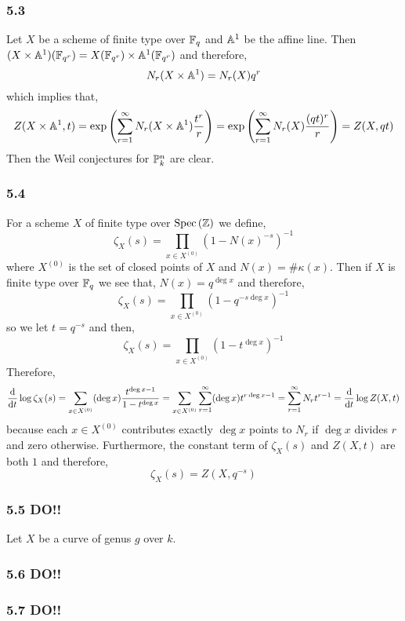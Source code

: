 \documentclass[12pt]{article}
\begin{document}
\subsubsection{5.3}

Let $X$ be a scheme of finite type over $\FF_q$ and $\A^1$ be the affine line. Then $(X \times \A^1)(\FF_{q^r}) = X(\FF_{q^r}) \times \A^1(\FF_{q^r})$ and therefore,
\[ N_r(X \times \A^1) = N_r(X) q^r \]
which implies that,
\[ Z(X \times \A^1, t) = \exp{ \left( \sum_{r = 1}^\infty N_r(X \times \A^1) \frac{t^r}{r} \right) } = \exp{ \left( \sum_{r = 1}^\infty N_r(X) \frac{(qt)^r}{r} \right) } = Z(X, qt) \]
Then the Weil conjectures for $\P^n_k$ are clear.

\subsubsection{5.4}

For a scheme $X$ of finite type over $\Spec{\Z}$ we define,
\[ \zeta_X(s) = \prod_{x \in X^{(0)}} (1 - N(x)^{-s})^{-1} \]
where $X^{(0)}$ is the set of closed points of $X$ and $N(x) = \# \kappa(x)$. Then if $X$ is finite type over $\FF_q$ we see that, $N(x) = q^{\deg{x}}$ and therefore,
\[ \zeta_X(s) = \prod_{x \in X^{(0)}} (1 - q^{-s \deg{x}})^{-1} \]
so we let $t = q^{-s}$ and then,
\[ \zeta_X(s) = \prod_{x \in X^{(0)}} (1 - t^{\deg{x}})^{-1} \]
Therefore,
\[ \deriv{}{t} \log{\zeta_X(s)} = \sum_{x \in X^{(0)}} (\deg{x}) \frac{t^{\deg{x} - 1}}{1 - t^{\deg{x}}} = \sum_{x \in X^{(0)}} \sum_{r = 1}^\infty (\deg{x}) t^{r \deg{x}-1} = \sum_{r = 1}^\infty N_r t^{r - 1} = \deriv{}{t} \log{Z(X, t)} \]
because each $x \in X^{(0)}$ contributes exactly $\deg{x}$ points to $N_r$ if $\deg{x}$ divides $r$ and zero otherwise. Furthermore, the constant term of $\zeta_X(s)$ and $Z(X, t)$ are both $1$ and therefore,
\[ \zeta_X(s) = Z(X, q^{-s}) \]

\subsubsection{5.5 DO!!}

Let $X$ be a curve of genus $g$ over $k$. 

\subsubsection{5.6 DO!!}

\subsubsection{5.7 DO!!}
\end{document}
